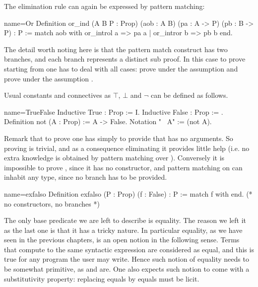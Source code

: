 The elimination rule can again be expressed by pattern matching:

\begin{coq}{name=Or}{}
Definition or_ind (A B P : Prop)
  (aob : A \/ B) (pa : A -> P) (pb : B -> P) : P :=
  match aob with or_introl a => pa a | or_intror b => pb b end.
\end{coq}

The detail worth noting here is that the pattern match construct has two
branches, and each branch represents a distinct sub proof.  In this
case to prove  starting from  one has to deal with all
cases: prove  under the assumption  and prove 
under the assumption .

Usual constants and connectives as $\top$, $\bot$ and $\neg$
can be defined as follows.

\begin{coq}{name=TrueFalse}{}
Inductive True : Prop := I.
Inductive False : Prop := .
Definition not (A : Prop) := A -> False.
Notation "~ A" := (not A).
\end{coq}

Remark that to prove  one has simply to provide  that has no
arguments.  So proving  is trivial, and as a consequence eliminating it
provides little help (i.e. no extra knowledge is obtained by pattern matching
over ).  Conversely it is impossible to prove , since it has no
constructor, and pattern matching on  can inhabit any type, since no
branch has to be provided.

\begin{coq}{name=exfalso}{}
Definition exfalso (P : Prop) (f : False) : P :=
  match f with end.  (* no constructors, no branches *)
\end{coq}

The only base predicate we are left to describe is equality.  The reason we
left it as the last one is that it has a tricky nature.  In particular
equality, as we have seen in the previous chapters, is an open notion
in the following sense.  Terms that compute to the same syntactic expression
are considered as equal, and this is true for any program the user may write.
Hence such notion of equality needs to be somewhat primitive, as
 and  are.  One also expects such notion to come
with a substitutivity property: replacing equals by equals must be licit.

